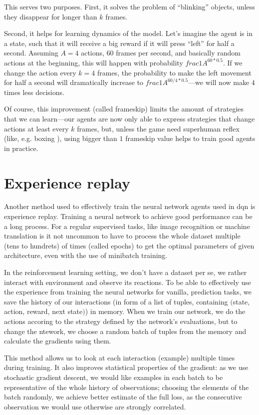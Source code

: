 This serves two purposes. First, it solves the problem of ``blinking'' objects, unless they disappear for longer than $k$ frames.

Second, it helps for learning dynamics of the model. Let's imagine the agent is in a state, such that it will receive a big reward if it will press ``left'' for half a second. Assuming $A=4$ actions, $60$ frames per second, and basically random actions at the beginning, this will happen with probability $frac{1}{A^{60 * 0.5}}$. If we change the action every $k=4$ frames, the probability to make the left movement for half a second will dramatically increase to $frac{1}{A^{60/4 * 0.5}}$---we will now make $4$ times less decisions.

Of course, this improvement (called frameskip) limits the amount of strategies that we can learn---our agents are now only able to express strategies that change actions at least every $k$ frames, but, unless the game need superhuman reflex (like, e.g. boxing ), using bigger than $1$ frameskip value helps to train good agents in practice.

\section{Experience replay}
Another method used to effectively train the neural network agents used in dqn is experience replay. Training a neural network to achieve good performance can be a long process. For a regular supervised tasks, like image recognition or machine translation is it not uncommon to have to process the whole dataset multiple (tens to hundrets) of times (called epochs) to get the optimal parameters of given architecture, even with the use of minibatch training.

In the reinforcement learning setting, we don't have a dataset per se, we rather interact with environment and observe its reactions. To be able to effectively use the experience from training the neural networks for vanilla, prediction tasks, we save the history of our interactions (in form of a list of tuples, containing $($state, action, reward, next state$)$) in memory. When we train our network, we do the actions accoring to the strategy defined by the network's evaluations, but to change the ntework, we choose a random batch of tuples from the memory and calculate the gradients using them.

This method allows us to look at each interaction (example) multiple times during training. It also improves statistical properties of the gradient: as we use stochastic gradient descent, we would like examples in each batch to be representative of the whole history of observations; choosing the elements of the batch randomly, we achieve better estimate of the full loss, as the consecutive observation we would use otherwise are strongly correlated.
